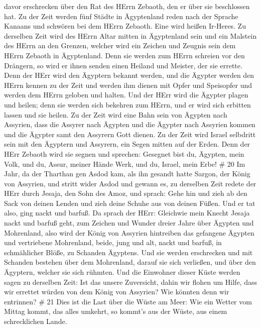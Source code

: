 davor erschrecken über den Rat des HErrn Zebaoth, den er über sie
beschlossen hat.  Zu der Zeit werden fünf Städte in
Ägyptenland reden nach der Sprache Kanaans und schwören bei dem HErrn
Zebaoth. Eine wird heißen Ir-Heres.  Zu derselben Zeit wird
des HErrn Altar mitten in Ägyptenland sein und ein Malstein des HErrn an
den Grenzen,  welcher wird ein Zeichen und Zeugnis sein dem
HErrn Zebaoth in Ägyptenland. Denn sie werden zum HErrn schreien vor den
Drängern, so wird er ihnen senden einen Heiland und Meister, der sie
errette.  Denn der HErr wird den Ägyptern bekannt werden,
und die Ägypter werden den HErrn kennen zu der Zeit und werden ihm
dienen mit Opfer und Speisopfer und werden dem HErrn geloben und halten.
 Und der HErr wird die Ägypter plagen und heilen; denn sie
werden sich bekehren zum HErrn, und er wird sich erbitten lassen und sie
heilen.  Zu der Zeit wird eine Bahn sein von Ägypten nach
Assyrien, dass die Assyrer nach Ägypten und die Ägypter nach Assyrien
kommen und die Ägypter samt den Assyrern Gott dienen.  Zu
der Zeit wird Israel selbdritt sein mit den Ägyptern und Assyrern, ein
Segen mitten auf der Erden.  Denn der HErr Zebaoth wird sie
segnen und sprechen: Gesegnet bist du, Ägypten, mein Volk, und du,
Assur, meiner Hände Werk, und du, Israel, mein Erbe! \# 20 
Im Jahr, da der Tharthan gen Asdod kam, als ihn gesandt hatte Sargon,
der König von Assyrien, und stritt wider Asdod und gewann es,
 zu derselben Zeit redete der HErr durch Jesaja, den Sohn
des Amoz, und sprach: Gehe hin und zieh ab den Sack von deinen Lenden
und zieh deine Schuhe aus von deinen Füßen. Und er tat also, ging nackt
und barfuß.  Da sprach der HErr: Gleichwie mein Knecht
Jesaja nackt und barfuß geht, zum Zeichen und Wunder dreier Jahre über
Ägypten und Mohrenland,  also wird der König von Assyrien
hintreiben das gefangene Ägypten und vertriebene Mohrenland, beide, jung
und alt, nackt und barfuß, in schmählicher Blöße, zu Schanden Ägyptens.
 Und sie werden erschrecken und mit Schanden bestehen über
dem Mohrenland, darauf sie sich verließen, und über den Ägyptern,
welcher sie sich rühmten.  Und die Einwohner dieser Küste
werden sagen zu derselben Zeit: Ist das unsere Zuversicht, dahin wir
flohen um Hilfe, dass wir errettet würden von dem König von Assyrien?
Wie könnten denn wir entrinnen? \# 21  Dies ist die Last
über die Wüste am Meer: Wie ein Wetter vom Mittag kommt, das alles
umkehrt, so kommt's aus der Wüste, aus einem schrecklichen Lande.
